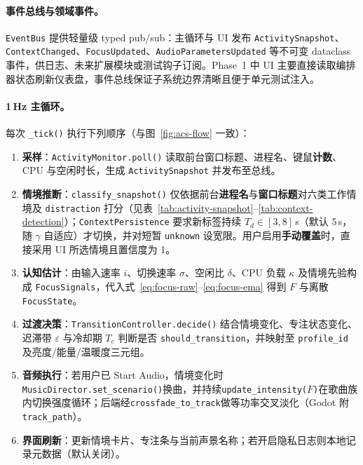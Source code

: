\documentclass[12pt, fontset=windows]{ctexart}
\begin{document}
\paragraph{事件总线与领域事件。}\texttt{EventBus} 提供轻量级 typed pub/sub：主循环与 UI 发布 \texttt{ActivitySnapshot}、\texttt{ContextChanged}、\texttt{FocusUpdated}、\texttt{AudioParametersUpdated} 等不可变 dataclass 事件，供日志、未来扩展模块或测试钩子订阅。Phase~1 中 UI 主要直接读取编排器状态刷新仪表盘，事件总线保证子系统边界清晰且便于单元测试注入。

\paragraph{1\,Hz 主循环。}每次 \texttt{\_tick()} 执行下列顺序（与图~\ref{fig:acs-flow} 一致）：
\begin{enumerate}[label=\arabic*.]
\item \textbf{采样}：\texttt{ActivityMonitor.poll()} 读取前台窗口标题、进程名、键鼠\textbf{计数}、CPU 与空闲时长，生成 \texttt{ActivitySnapshot} 并发布至总线。
\item \textbf{情境推断}：\texttt{classify\_snapshot()} 仅依据前台\textbf{进程名}与\textbf{窗口标题}对六类工作情境及 \texttt{distraction} 打分（见表~\ref{tab:activity-snapshot}--\ref{tab:context-detection}）；\texttt{ContextPersistence} 要求新标签持续 $T_d\in[3,8]$\,s（默认 5\,s，随 $\gamma$ 自适应）才切换，并对短暂 \texttt{unknown} 设宽限。用户启用\textbf{手动覆盖}时，直接采用 UI 所选情境且置信度为 1。
\item \textbf{认知估计}：由输入速率 $i$、切换速率 $\sigma$、空闲比 $\delta$、CPU 负载 $\kappa$ 及情境先验构成 \texttt{FocusSignals}，代入式~\eqref{eq:focus-raw}--\eqref{eq:focus-ema} 得到 $F$ 与离散 \texttt{FocusState}。
\item \textbf{过渡决策}：\texttt{TransitionController.decide()} 结合情境变化、专注状态变化、迟滞带 $\varepsilon$ 与冷却期 $T_c$ 判断是否 \texttt{should\_transition}，并映射至 \texttt{profile\_id} 及亮度/能量/温暖度三元组。
\item \textbf{音频执行}：若用户已 Start Audio，情境变化时\texttt{MusicDirector.set\_scenario()}换曲，并持续\texttt{update\_intensity($F$)}在歌曲族内切换强度循环；后端经\texttt{crossfade\_to\_track}做等功率交叉淡化（Godot 附\texttt{track\_path}）。
\item \textbf{界面刷新}：更新情境卡片、专注条与当前声景名称；若开启隐私日志则本地记录元数据（默认关闭）。
\end{enumerate}
\end{document}
